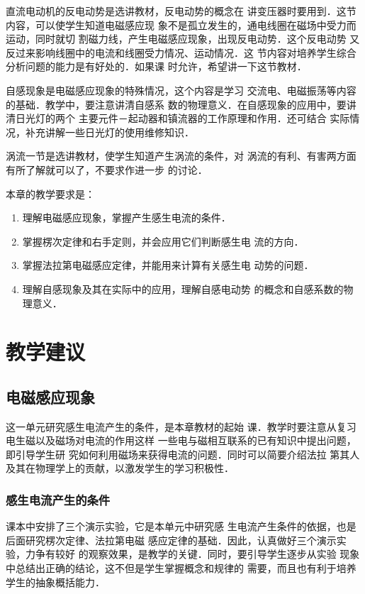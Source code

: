 直流电动机的反电动势是选讲教材，反电动势的概念在
讲变压器时要用到．这节内容，可以使学生知道电磁感应现
象不是孤立发生的，通电线圈在磁场中受力而运动，同时就切
割磁力线，产生电磁感应现象，出现反电动势．这个反电动势
又反过来影响线圈中的电流和线圈受力情况、运动情况．这
节内容对培养学生综合分析问题的能力是有好处的．如果课
时允许，希望讲一下这节教材．

自感现象是电磁感应现象的特殊情况，这个内容是学习
交流电、电磁振荡等内容的基础．教学中，要注意讲清自感系
数的物理意义．在自感现象的应用中，要讲清日光灯的两个
主要元件－起动器和镇流器的工作原理和作用．还可结合
实际情况，补充讲解一些日光灯的使用维修知识．

涡流一节是选讲教材，使学生知道产生涡流的条件，对
涡流的有利、有害两方面有所了解就可以了，不要求作进一步
的讨论．

本章的教学要求是：
\begin{enumerate}
\item 理解电磁感应现象，掌握产生感生电流的条件．
\item 掌握楞次定律和右手定则，并会应用它们判断感生电
流的方向．
\item 掌握法拉第电磁感应定律，并能用来计算有关感生电
动势的问题．
\item 理解自感现象及其在实际中的应用，理解自感电动势
的概念和自感系数的物理意义．
\end{enumerate}

\section{教学建议}
\subsection{电磁感应现象}
这一单元研究感生电流产生的条件，是本章教材的起始
课．教学时要注意从复习电生磁以及磁场对电流的作用这样
一些电与磁相互联系的已有知识中提出问题，即引导学生研
究如何利用磁场来获得电流的问题．同时可以简要介绍法拉
第其人及其在物理学上的贡献，以激发学生的学习积极性．

\subsubsection{感生电流产生的条件}
课本中安排了三个演示实验，它是本单元中研究感
生电流产生条件的依据，也是后面研究楞次定律、法拉第电磁
感应定律的基础．因此，认真做好三个演示实验，力争有较好
的观察效果，是教学的关键．同时，要引导学生逐步从实验
现象中总结出正确的结论，这不但是学生掌握概念和规律的
需要，而且也有利于培养学生的抽象概括能力．

